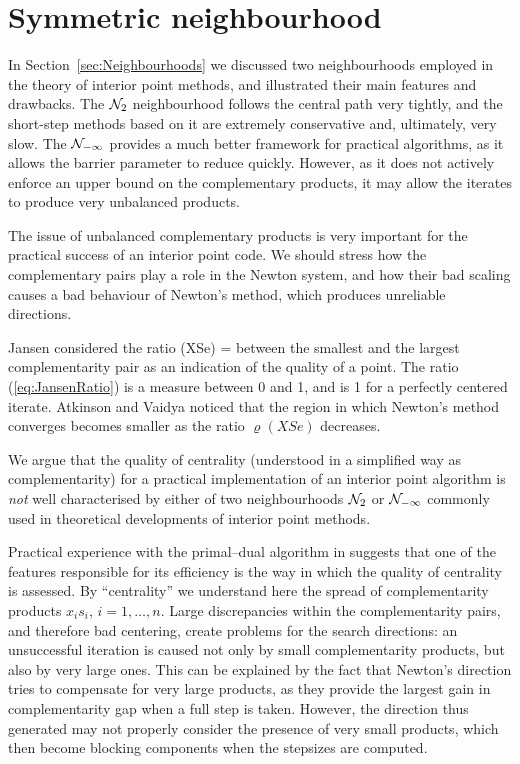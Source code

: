 %
%
\section{Symmetric neighbourhood}
\label{sec:SymNeighbourhood}

In Section~\ref{sec:Neighbourhoods} we discussed two neighbourhoods
employed in the theory of interior point methods, 
and illustrated their main features and drawbacks.
The $\mathcal{N}_2$ neighbourhood follows the central path very tightly, 
and the short-step methods
based on it are extremely conservative and, ultimately, very slow.
The $\mathcal{N}_{-\infty}$ provides a much better framework 
for practical algorithms, as it allows 
the barrier parameter to reduce quickly. However, as it does not actively
enforce an upper bound on the complementary products, it may allow the
iterates to produce very unbalanced products.

The issue of unbalanced complementary products is very important for
the practical success of an interior point code. 
We should stress how
the complementary pairs play a role in the Newton system, and how
their bad scaling causes a bad behaviour of Newton's method, which
produces unreliable directions.

Jansen \cite{phd:Jansen} considered the ratio 
\be  \label{eq:JansenRatio}
  \varrho(XSe) = 
\ee
between the smallest and the largest complementarity pair as an 
indication of the quality of a point.
The ratio (\ref{eq:JansenRatio}) is a measure between 0 and 1, and is 1
for a perfectly centered iterate.
Atkinson and Vaidya \cite{AtkinsonVaidya} noticed that 
the region in which Newton's method converges becomes smaller
as the ratio $\varrho(XSe)$ decreases. 

We argue that the quality of centrality 
(understood in a simplified way as complementarity)
for a practical implementation of an interior point algorithm
is {\it not} well characterised by either of two neighbourhoods 
$\mathcal{N}_2$ or $\mathcal{N}_{-\infty}$ commonly used in theoretical developments 
of interior point methods.

Practical experience with the primal--dual algorithm in \HOPDM \cite{HOPDM}
suggests that one of the features responsible 
for its efficiency is the way in which the quality of centrality 
is assessed. By ``centrality'' we understand here the spread 
of complementarity products $x_i s_i$, $i = 1,\dots,n$.
Large discrepancies within the complementarity 
pairs, and therefore bad centering, create problems for the search 
directions: an unsuccessful iteration is caused not only by small
complementarity products, but also by very large ones.
%
 This can be explained by the fact that
Newton's direction tries to compensate for very 
large products, as they provide the largest gain in complementarity 
gap when a full step is taken. However, the direction thus generated 
may not properly consider the presence of very small products, 
which then become blocking components when the stepsizes are computed.

